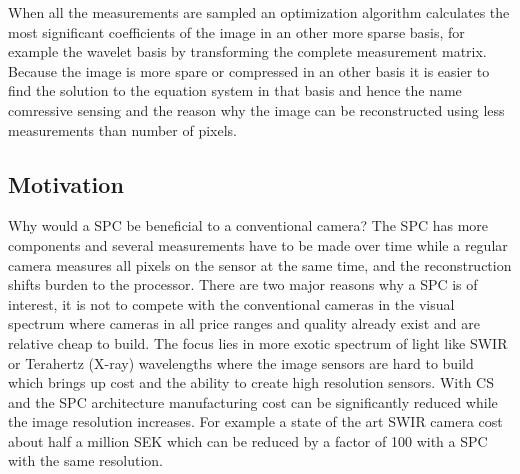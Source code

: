 When all the measurements are sampled an optimization algorithm calculates the most significant coefficients of the image in an other more sparse basis, for example the wavelet basis by transforming the complete measurement matrix. Because the image is more spare or compressed in an other basis it is easier to find the solution to the equation system in that basis and hence the name comressive sensing and the reason why the image can be reconstructed using less measurements than number of pixels.    









   

 
\subsection{Motivation}
Why would a SPC be beneficial to a conventional camera? The SPC has more components and several measurements have to be made over time while a regular camera measures all pixels on the sensor at the same time, and the reconstruction shifts burden to the processor. There are two major reasons why a SPC is of interest, it is not to compete with the conventional cameras in the visual spectrum where cameras in all price ranges and quality already exist and are relative cheap to build. The focus lies in more exotic spectrum of light like SWIR or Terahertz (X-ray) wavelengths where the image sensors are hard to build which brings up cost and the ability to create high resolution sensors. With CS and the SPC architecture manufacturing cost can be significantly reduced while the image resolution increases. For example a state of the art SWIR camera cost about half a million SEK which can be reduced by a factor of 100 with a SPC with the same resolution. 

